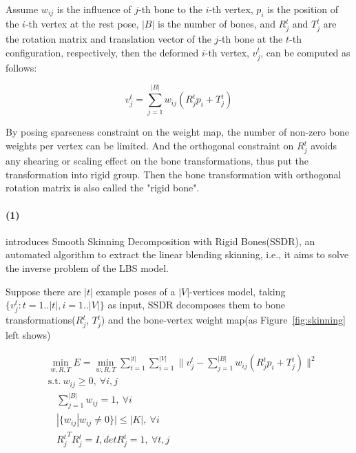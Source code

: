 Assume
$w_{ij}$ is the influence of $j$-th bone to the $i$-th vertex,
$p_{i}$ is the position of the $i$-th vertex at the rest pose,
$|B|$ is the number of bones, and
$R{_{j}^{t}}$ and $T{_{j}^{t}}$ are the rotation matrix and translation vector of the $j$-th bone at the $t$-th configuration, respectively,
then the deformed $i$-th vertex, $v{_{j}^{t}}$, can be computed as follows:

\small{
\begin{equation}
 \label{eq:LBS}
 v{_{j}^{t}}=\sum_{j=1}^{|B|}w_{ij}(R{_{j}^{t}}p_{i}+T{_{j}^{t}})
\end{equation}
}

By posing sparseness constraint on the weight map, the number of non-zero bone weights per vertex can be limited.
And the orthogonal constraint on $R{_{j}^{t}}$ avoids any shearing or scaling effect on the bone transformations,
thus put the transformation into rigid group.
Then the bone transformation with orthogonal rotation matrix is also called the "rigid bone".


\paragraph{(1)}
\cite{le2012smooth} introduces Smooth Skinning Decomposition with Rigid Bones(SSDR), an automated algorithm to extract the linear blending skinning, i.e., it aims to solve the inverse problem of the LBS model.

Suppose there are $|t|$ example poses of a $|V|$-vertices model, taking $\{v{_{j}^{t}}: t=1..|t|,i=1..|V|\}$ as input, SSDR decomposes them to bone transformations($R{_{j}^{t}}$, $T{_{j}^{t}}$) and the bone-vertex weight map(as Figure~\ref{fig:skinning} left shows)

\small{
\begin{equation}
 \label{eq:SSDR}
 \begin{split}
 & \min_{w,R,T}E=\min_{w,R,T}\sum_{t=1}^{|t|}\sum_{i=1}^{|V|}\|v{_{j}^{t}}-\sum_{j=1}^{|B|}w_{ij}(R{_{j}^{t}}p_{i}+T{_{j}^{t}})\|^2 \\
 & \mathrm{s.t.}~w_{ij}\ge0,~\forall i,j\\
 & ~~~~\sum_{j=1}^{|B|}w_{ij}=1,~\forall i\\
 & ~~~~|\{w_{ij}|w_{ij}\neq0\}|\le|K|,~\forall i \\
 & ~~~~{R{_{j}^{t}}}^{T}R{_{j}^{t}}=I,detR{_{j}^{t}}=1,~\forall t,j
 \end{split}
\end{equation}
}

